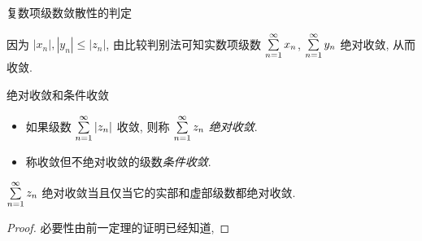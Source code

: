 \begin{frame}{复数项级数敛散性的判定}
\onslide<+->
\begin{proof*}
因为 $|x_n|,|y_n|\le|z_n|$, 由比较判别法可知实数项级数 $\sum\limits_{n=1}^\infty x_n$, $\sum\limits_{n=1}^\infty y_n$ 绝对收敛, 从而收敛.

\end{proof*}
\end{frame}


\begin{frame}{绝对收敛和条件收敛}
\onslide<+->
\begin{definition}
\begin{itemize}
\item 如果级数 $\sum\limits_{n=1}^\infty |z_n|$ 收敛, 则称 $\sum\limits_{n=1}^\infty z_n$ \emph{绝对收敛}.
\item 称收敛但不绝对收敛的级数\emph{条件收敛}.
\end{itemize}
\end{definition}
\onslide<+->
\begin{theorem}
$\sum\limits_{n=1}^\infty z_n$ 绝对收敛当且仅当它的实部和虚部级数都绝对收敛.
\end{theorem}
\onslide<+->
\begin{proof}
必要性由前一定理的证明已经知道,
\end{proof}
\end{frame}


